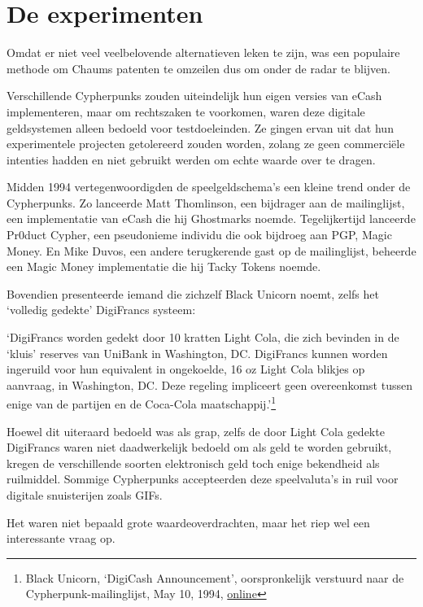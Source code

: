 \documentclass[
  a5paper,
  smalldemyvopaper,11pt,twoside,onecolumn,openright,extrafontsizes,
hidelinks]{memoir}
\begin{document}
\section{De experimenten}\label{de-experimenten}

Omdat er niet veel veelbelovende alternatieven leken te zijn, was een
populaire methode om Chaums patenten te omzeilen dus om onder de radar
te blijven.

Verschillende Cypherpunks zouden uiteindelijk hun eigen versies van
eCash implementeren, maar om rechtszaken te voorkomen, waren deze
digitale geldsystemen alleen bedoeld voor testdoeleinden. Ze gingen
ervan uit dat hun experimentele projecten getolereerd zouden worden,
zolang ze geen commerciële intenties hadden en niet gebruikt werden om
echte waarde over te dragen.

Midden 1994 vertegenwoordigden de speelgeldschema's een kleine trend
onder de Cypherpunks. Zo lanceerde Matt Thomlinson, een bijdrager aan de
mailinglijst, een implementatie van eCash die hij Ghostmarks noemde.
Tegelijkertijd lanceerde Pr0duct Cypher, een pseudonieme individu die
ook bijdroeg aan PGP, Magic Money. En Mike Duvos, een andere
terugkerende gast op de mailinglijst, beheerde een Magic Money
implementatie die hij Tacky Tokens noemde.

Bovendien presenteerde iemand die zichzelf Black Unicorn noemt, zelfs
het `volledig gedekte' DigiFrancs systeem:

`DigiFrancs worden gedekt door 10 kratten Light Cola, die zich bevinden
in de `kluis' reserves van UniBank in Washington, DC. DigiFrancs kunnen
worden ingeruild voor hun equivalent in ongekoelde, 16 oz Light Cola
blikjes op aanvraag, in Washington, DC. Deze regeling impliceert geen
overeenkomst tussen enige van de partijen en de Coca-Cola
maatschappij.'\footnote{Black Unicorn, `DigiCash Announcement',
  oorspronkelijk verstuurd naar de Cypherpunk-mailinglijst, May 10,
  1994,
  \href{https://cypherpunks.venona.com/date/1994/05/msg00616.html}{online}}

Hoewel dit uiteraard bedoeld was als grap, zelfs de door Light Cola
gedekte DigiFrancs waren niet daadwerkelijk bedoeld om als geld te
worden gebruikt, kregen de verschillende soorten elektronisch geld toch
enige bekendheid als ruilmiddel. Sommige Cypherpunks accepteerden deze
speelvaluta's in ruil voor digitale snuisterijen zoals GIFs.

Het waren niet bepaald grote waardeoverdrachten, maar het riep wel een
interessante vraag op.
\end{document}
